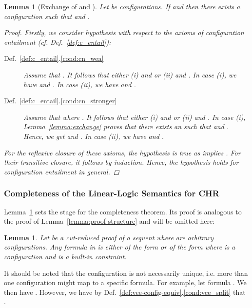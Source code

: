 \documentclass[acmtocl]{acmtrans2m}
\newtheorem{lemma}[theorem]{Lemma}
\begin{document}
\begin{lemma}[Exchange of  and ]\label{lemma:vee-exchange}
  Let  be configurations. If  and  then there exists a configuration  such that
   and .
\begin{proof}
Firstly, we consider hypothesis with respect to the axioms of configuration
entailment (cf. Def.~\ref{def:c_entail}):
\begin{description}
 \item [Def.~\ref{def:c_entail}.\ref{cond:cn_wea}]
	Assume that . It follows that either (i)
	 and  or (ii)  and
	. In case (i), we have  and .
	In case (ii), we have  and .
 \item [Def.~\ref{def:c_entail}.\ref{cond:cn_stronger}]
	Assume that  where
	. It follows that either (i)  and
	 or (ii)  and .
	In case (i), Lemma~\ref{lemma:exchange} proves that there exists an  such
	that  and . Hence, we get
	 and . In case
	(ii), we have  and .
\end{description}
For the reflexive closure of these axioms, the hypothesis is true as
 implies . For their transitive closure, it follows by
induction. Hence, the hypothesis holds for configuration entailment in general.
\end{proof}
\end{lemma}

\subsubsection{Completeness of the Linear-Logic Semantics for
CHR}

Lemma~\ref{lemma:vee-proof-structure} sets the stage for the completeness
theorem. Its proof is analogous to the proof of Lemma~\ref{lemma:proof-structure}
and will be omitted here:

\begin{lemma}
\label{lemma:vee-proof-structure}
Let  be a cut-reduced proof of a sequent  where 
are arbitrary configurations. Any formula  in  is either of the form
 or of the form  where  is a
configuration and  is a built-in constraint.
\end{lemma}

It should be noted that the configuration
 is not necessarily unique, i.e. more than one configuration might
map to a specific formula. For example, let formula . We
then have
. However, we
have by Def.~\ref{def:vee-config-equiv}.\ref{cond:vce_split} that
.
\end{document}
